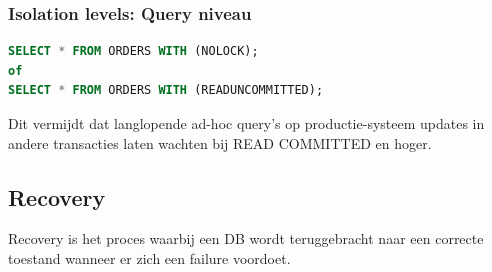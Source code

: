 \documentclass[a4paper,12pt]{article}
\begin{document}
\subsubsection{Isolation levels: Query niveau}
\begin{lstlisting}[language=sql, breaklines=true]
SELECT * FROM ORDERS WITH (NOLOCK);
of
SELECT * FROM ORDERS WITH (READUNCOMMITTED);
\end{lstlisting}
Dit vermijdt dat langlopende ad-hoc query's op productie-systeem updates in andere transacties laten wachten bij READ COMMITTED en hoger.

\subsection{Recovery}
Recovery is het proces waarbij een DB wordt teruggebracht naar een correcte toestand wanneer er zich een failure voordoet.
\end{document}
